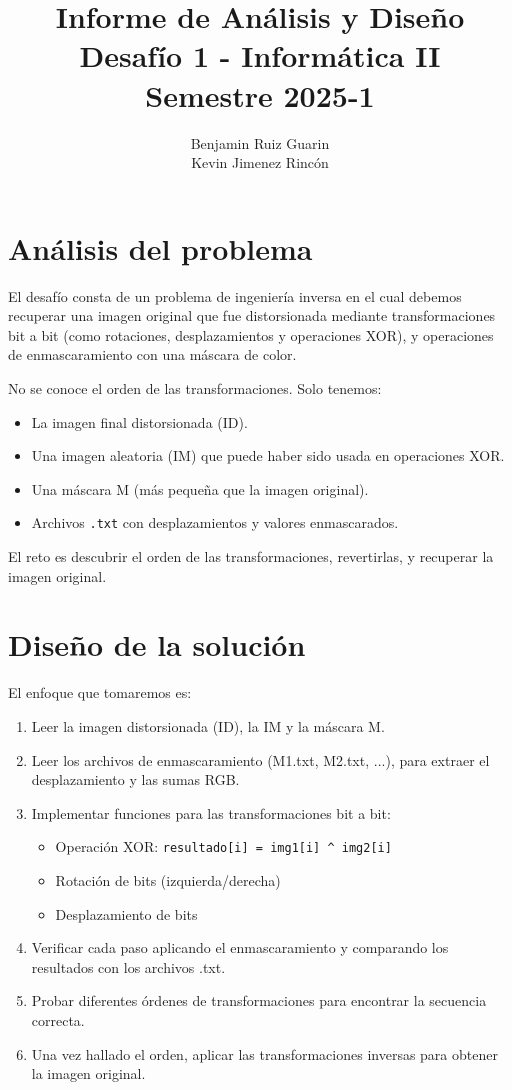 \documentclass[11pt]{article}
\title{Informe de Análisis y Diseño\\Desafío 1 - Informática II\\Semestre 2025-1}
\author{Benjamin Ruiz Guarin\\Kevin Jimenez Rincón}
\begin{document}
\maketitle

\section{Análisis del problema}

El desafío consta de un problema de ingeniería inversa en el cual debemos recuperar una imagen original que fue distorsionada mediante transformaciones bit a bit (como rotaciones, desplazamientos y operaciones XOR), y operaciones de enmascaramiento con una máscara de color.

No se conoce el orden de las transformaciones. Solo tenemos:
\begin{itemize}
  \item La imagen final distorsionada (ID).
  \item Una imagen aleatoria (IM) que puede haber sido usada en operaciones XOR.
  \item Una máscara M (más pequeña que la imagen original).
  \item Archivos \texttt{.txt} con desplazamientos y valores enmascarados.
\end{itemize}

El reto es descubrir el orden de las transformaciones, revertirlas, y recuperar la imagen original.

\section{Diseño de la solución}

El enfoque que tomaremos es:

\begin{enumerate}
  \item Leer la imagen distorsionada (ID), la IM y la máscara M.
  \item Leer los archivos de enmascaramiento (M1.txt, M2.txt, ...), para extraer el desplazamiento y las sumas RGB.
  \item Implementar funciones para las transformaciones bit a bit:
  \begin{itemize}
    \item Operación XOR: \texttt{resultado[i] = img1[i] \^{} img2[i]}
    \item Rotación de bits (izquierda/derecha)
    \item Desplazamiento de bits
  \end{itemize}
  \item Verificar cada paso aplicando el enmascaramiento y comparando los resultados con los archivos .txt.
  \item Probar diferentes órdenes de transformaciones para encontrar la secuencia correcta.
  \item Una vez hallado el orden, aplicar las transformaciones inversas para obtener la imagen original.
\end{enumerate}
\end{document}
